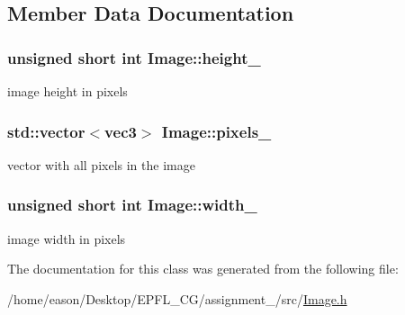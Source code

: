 \subsection{Member Data Documentation}
\subsubsection[{\texorpdfstring{height\+\_\+}{height_}}]{\setlength{\rightskip}{0pt plus 5cm}unsigned short int Image\+::height\+\_\+\hspace{0.3cm}{\ttfamily [private]}}\hypertarget{classImage_a61db48547d78218ecc7b1fff35f011c2}{}\label{classImage_a61db48547d78218ecc7b1fff35f011c2}


image height in pixels 

\subsubsection[{\texorpdfstring{pixels\+\_\+}{pixels_}}]{\setlength{\rightskip}{0pt plus 5cm}std\+::vector$<${\bf vec3}$>$ Image\+::pixels\+\_\+\hspace{0.3cm}{\ttfamily [private]}}\hypertarget{classImage_af271f3879d09bcba694164048f94172c}{}\label{classImage_af271f3879d09bcba694164048f94172c}


vector with all pixels in the image 

\subsubsection[{\texorpdfstring{width\+\_\+}{width_}}]{\setlength{\rightskip}{0pt plus 5cm}unsigned short int Image\+::width\+\_\+\hspace{0.3cm}{\ttfamily [private]}}\hypertarget{classImage_a8734c4cebb55f81253f34a8474ef52e5}{}\label{classImage_a8734c4cebb55f81253f34a8474ef52e5}


image width in pixels 



The documentation for this class was generated from the following file\+:\begin{DoxyCompactItemize}
\item 
/home/eason/\+Desktop/\+E\+P\+F\+L\+\_\+\+C\+G/assignment\+\_/src/\hyperlink{Image_8h}{Image.\+h}\end{DoxyCompactItemize}
